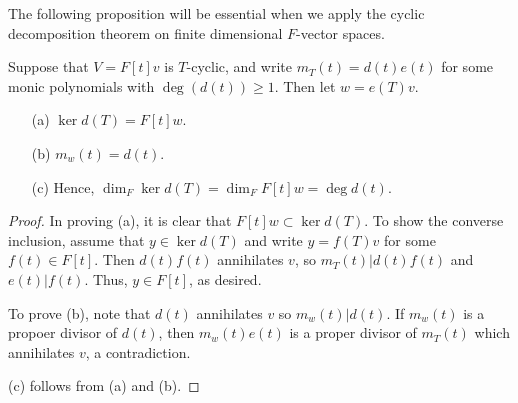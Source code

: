 The following proposition will be essential when we apply the cyclic decomposition theorem on finite dimensional $F$-vector spaces.
\begin{prop}
    Suppose that $V=F[t]v$ is $T$-cyclic, and write $m_T(t)=d(t)e(t)$ for some monic polynomials with $\deg(d(t))\geq 1$.
    Then let $w=e(T)v$.
    \begin{enumerate}
        \item[(a)]
        {
            $\ker d(T)=F[t]w$.
        }
        \item[(b)]
        {
            $m_w(t)=d(t)$.
        }
        \item[(c)]
        {
            Hence, $\dim_F\ker d(T)=\dim_F F[t]w=\deg d(t)$.
        }
    \end{enumerate}
\end{prop}
\begin{proof}
    In proving (a), it is clear that $F[t]w\subset \ker d(T)$.
    To show the converse inclusion, assume that $y\in\ker d(T)$ and write $y=f(T)v$ for some $f(t)\in F[t]$.
    Then $d(t)f(t)$ annihilates $v$, so $m_T(t)|d(t)f(t)$ and $e(t)|f(t)$.
    Thus, $y\in F[t]$, as desired.

    To prove (b), note that $d(t)$ annihilates $v$ so $m_w(t)|d(t)$.
    If $m_w(t)$ is a propoer divisor of $d(t)$, then $m_w(t)e(t)$ is a proper divisor of $m_T(t)$ which annihilates $v$, a contradiction.

    (c) follows from (a) and (b).
\end{proof}
